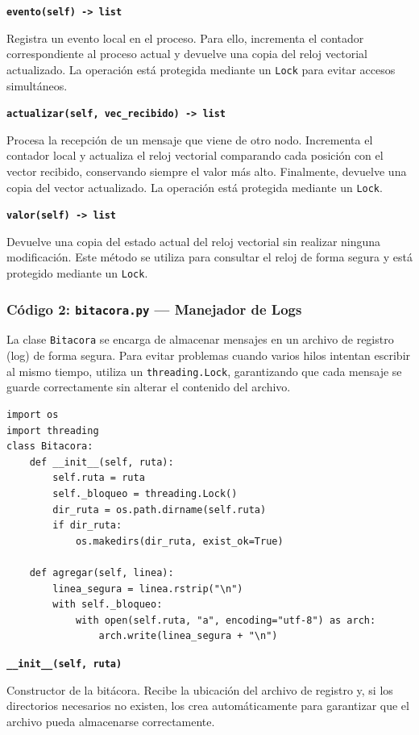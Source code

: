 \documentclass[letterpaper,11pt]{article}
\begin{document}
\textbf{\texttt{evento(self) -> list}}

Registra un evento local en el proceso. Para ello, incrementa el contador
correspondiente al proceso actual y devuelve una copia del reloj vectorial
actualizado. La operación está protegida mediante un \texttt{Lock} para
evitar accesos simultáneos.

\textbf{\texttt{actualizar(self, vec\_recibido) -> list}}

Procesa la recepción de un mensaje que viene de otro nodo. Incrementa el contador local y actualiza el reloj vectorial comparando
cada posición con el vector recibido, conservando siempre el valor más
alto. Finalmente, devuelve una copia del vector actualizado. La operación
está protegida mediante un \texttt{Lock}.

\textbf{\texttt{valor(self) -> list}}

Devuelve una copia del estado actual del reloj vectorial sin realizar
ninguna modificación. Este método se utiliza para consultar el reloj de
forma segura y está protegido mediante un \texttt{Lock}.

\subsubsection{Código 2: \texttt{bitacora.py} — Manejador de Logs}

La clase \texttt{Bitacora} se encarga de almacenar mensajes en un archivo
de registro (log) de forma segura. Para evitar problemas cuando varios
hilos intentan escribir al mismo tiempo, utiliza un
\texttt{threading.Lock}, garantizando que cada mensaje se guarde
correctamente sin alterar el contenido del archivo.

\begin{lstlisting}[style=python, caption={bitacora.py — Escritura concurrente de logs}]
import os
import threading
class Bitacora:
    def __init__(self, ruta):
        self.ruta = ruta
        self._bloqueo = threading.Lock()
        dir_ruta = os.path.dirname(self.ruta)
        if dir_ruta:
            os.makedirs(dir_ruta, exist_ok=True)
 
    def agregar(self, linea):
        linea_segura = linea.rstrip("\n")
        with self._bloqueo:
            with open(self.ruta, "a", encoding="utf-8") as arch:
                arch.write(linea_segura + "\n")
\end{lstlisting}

\textbf{\texttt{\_\_init\_\_(self, ruta)}}

Constructor de la bitácora. Recibe la ubicación del archivo de registro y,
si los directorios necesarios no existen, los crea automáticamente para
garantizar que el archivo pueda almacenarse correctamente.
\end{document}
